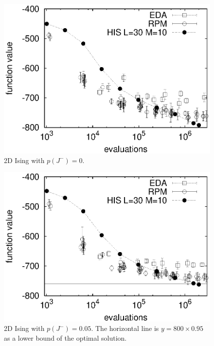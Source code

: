 \begin{figure}[tbp]
\centerline{
\includegraphics[width=\figlength\linewidth]{./data_aexp/2d_100.eps}}
\caption{2D Ising with $p(J^{-})=0$.}
\label{result-2d-flust0}
\end{figure}
\begin{figure}[tbp]
\centerline{
\includegraphics[width=\figlength\linewidth]{./data_aexp/2d_95.eps}}
\caption{2D Ising with $p(J^{-})=0.05$. 
The horizontal line is
 $y=800\times 0.95$ as a lower bound of the optimal solution. }
\label{result-2d-flust5}
\end{figure}
